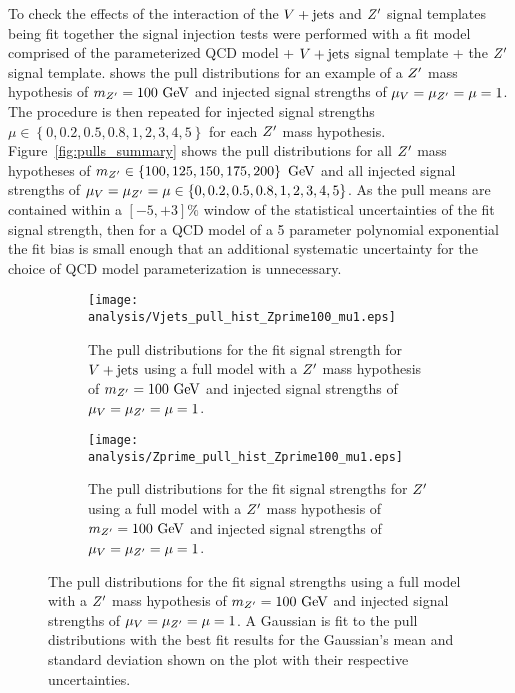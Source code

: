 To check the effects of the interaction of the $\Vjets$ and $\Zprime$ signal templates being fit together the signal injection tests were performed with a fit model comprised of the parameterized QCD model + $\Vjets$ signal template + the $\Zprime$ signal template.
 shows the pull distributions for an example of a $\Zprime$ mass hypothesis of $m_{\Zprime}=100~\GeV$ and injected signal strengths of $\mu_{V} = \mu_{\Zprime} = \mu = 1$.
The procedure is then repeated for injected signal strengths $\mu \in \left\{0, 0.2, 0.5, 0.8, 1, 2, 3, 4, 5\right\}$ for each $\Zprime$ mass hypothesis.
Figure~\ref{fig:pulls_summary} shows the pull distributions for all $\Zprime$ mass hypotheses of $m_{Z'} \in \left\{100, 125, 150, 175, 200\right\}~\mathrm{GeV}$ and all injected signal strengths of $\mu_{V} = \mu_{Z'} = \mu \in \left\{0, 0.2, 0.5, 0.8, 1, 2, 3, 4, 5\right\}$.
As the pull means are contained within a $\left[-5,+3\right]\%$ window of the statistical uncertainties of the fit signal strength, then for a QCD model of a 5 parameter polynomial exponential the fit bias is small enough that an additional systematic uncertainty for the choice of QCD model parameterization is unnecessary.

\begin{figure}[htbp]
 \centering
 \begin{subfigure}[t]{0.48\textwidth}
  \centering
  \texttt{[image: analysis/Vjets\_pull\_hist\_Zprime100\_mu1.eps]}
  \caption[The pull distributions for the fit signal strength for $\Vjets$ using a full model with a $\Zprime$ mass hypothesis of $m_{\Zprime}=100~\GeV$.]{%
   The pull distributions for the fit signal strength for $\Vjets$ using a full model with a $\Zprime$ mass hypothesis of $m_{\Zprime}=100~\GeV$ and injected signal strengths of $\mu_{V} = \mu_{\Zprime} = \mu = 1$.}
  \label{fig:Vjets_pulls_Zprime100_mu1}
 \end{subfigure}%
 \quad
 \begin{subfigure}[t]{0.48\textwidth}
  \centering
  \texttt{[image: analysis/Zprime\_pull\_hist\_Zprime100\_mu1.eps]}
  \caption[The pull distributions for the fit signal strengths for $\Zprime$ using a full model with a $\Zprime$ mass hypothesis of $m_{\Zprime}=100~\GeV$.]{%
   The pull distributions for the fit signal strengths for $\Zprime$ using a full model with a $\Zprime$ mass hypothesis of $m_{\Zprime}=100~\GeV$ and injected signal strengths of $\mu_{V} = \mu_{\Zprime} = \mu = 1$.}
  \label{fig:Zprime_pulls_Zprime100_mu1}
 \end{subfigure}
 \caption[The pull distributions for the fit signal strengths using a full model with a $\Zprime$ mass hypothesis of $m_{\Zprime}=100~\GeV$ and injected signal strengths of $\mu_{V} = \mu_{\Zprime} = \mu = 1$.]{%
  The pull distributions for the fit signal strengths using a full model with a $\Zprime$ mass hypothesis of $m_{\Zprime}=100~\GeV$ and injected signal strengths of $\mu_{V} = \mu_{\Zprime} = \mu = 1$.
  A Gaussian is fit to the pull distributions with the best fit results for the Gaussian's mean and standard deviation shown on the plot with their respective uncertainties.}
 \label{fig:pulls_Zprime100_mu1}
\end{figure}

